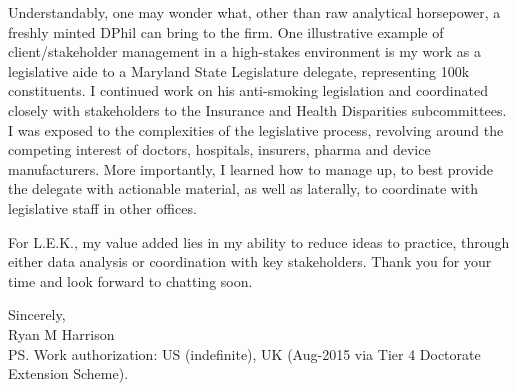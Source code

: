 \documentclass[a4paper]{../res}
\begin{document}
\begin{sloppypar}
\begin{resume}
Understandably, one may wonder what, other than raw analytical horsepower, a freshly minted DPhil can bring to the firm. One illustrative example of client/stakeholder management in a high-stakes environment is my work as a legislative aide to a Maryland State Legislature delegate, representing 100k constituents. I continued work on his anti-smoking legislation and coordinated closely with stakeholders to the Insurance and Health Disparities subcommittees. I was exposed to the complexities of the legislative process, revolving around the competing interest of doctors, hospitals, insurers, pharma and device manufacturers. More importantly, I learned how to manage up, to best provide the delegate with actionable material, as well as laterally, to coordinate with legislative staff in other offices.

For L.E.K., my value added lies in my ability to reduce ideas to practice, through either data analysis or coordination with key stakeholders. Thank you for your time and look forward to chatting soon.

Sincerely, \\
Ryan M Harrison \\
PS. Work authorization: US (indefinite), UK (Aug-2015 via Tier 4 Doctorate Extension Scheme). 


\end{resume} 
\end{sloppypar}
\end{document}
